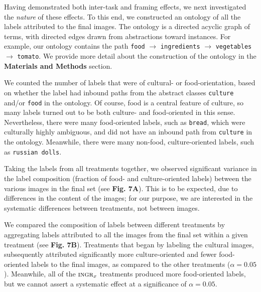 \documentclass[a4paper]{report}
\begin{document}
Having demonstrated both inter-task and framing effects, we next
investigated the \textit{nature} of these effects.  To this
end, we constructed an ontology of all the labels attributed to
the final images.   
The ontology is a directed acyclic graph of terms,
with directed edges drawn from abstractions toward instances.  For example,
our ontology contains the path \texttt{food} $\to$ \texttt{ingredients} $\to$ 
\texttt{vegetables} 
$\to$ \texttt{tomato}. We provide more detail about the construction of the 
ontology in the \textbf{Materials and Methods} section.

We counted the number of labels that were of cultural- 
or food-orientation,
based on whether the label had inbound paths from the 
abstract classes \texttt{culture} and/or \texttt{food} in the ontology. Of 
course, food is a central feature of culture, so many labels turned out to be
both culture- and food-oriented in this sense.  Nevertheless, there were many 
food-oriented labels, such as \texttt{bread}, which were culturally highly 
ambiguous, and did not have an inbound path from \texttt{culture} in the 
ontology.  Meanwhile, there were many non-food, culture-oriented labels, such
as \texttt{russian dolls}. 


Taking the labels from all treatments together, we observed significant 
variance in the label composition (fraction of food- and culture-oriented 
labels) between the various 
images in the final set (see \textbf{Fig. 7A}).  This is to be expected, due 
to differences in the content of the images; for our purpose, we are 
interested in the systematic differences between treatments, not between 
images.

We compared the composition of labels between different treatments by
aggregating labels attributed to all the images from the final set within a 
given treatment (see \textbf{Fig. 7B}).  
Treatments that began by labeling the cultural images, 
subsequently attributed significantly more culture-oriented and fewer 
food-oriented labels to the final images, as compared to the other 
treatments ($\alpha=0.05$).  Meanwhile, all of the $\textsc{ingr}_x$ 
treatments produced more food-oriented labels, but we cannot assert a 
systematic effect at a significance of $\alpha = 0.05$. 
\end{document}

